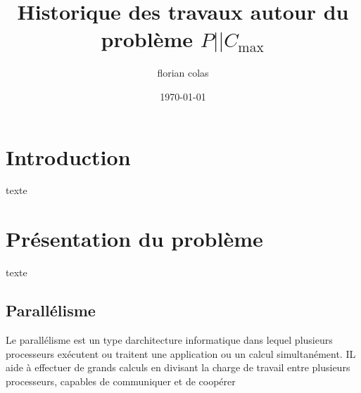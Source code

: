 \documentclass[a4paper,12pt]{report}
\title{Historique des travaux autour du problème $P||C_{\max}$}
\author{florian colas}
\date{\today}
\theoremstyle{plain}				%
\theoremstyle{definition}				%
\begin{document}
\maketitle

%
%
%
\renewcommand{\thesection}{\arabic{section}}
\renewcommand{\contentsname}{Sommaire}
\setcounter{tocdepth}{4}	%
\setcounter{secnumdepth}{3}	%
\tableofcontents

\section{Introduction}

texte


\section{Présentation du problème}
texte
\subsection{Parallélisme}
Le parallélisme est un type d{\textquotesingle}architecture informatique
dans lequel plusieurs processeurs exécutent ou traitent une application
ou un calcul simultanément. IL aide à effectuer de grands calculs en
divisant la charge de travail entre plusieurs processeurs, capables de communiquer et de coopérer
\end{document}
